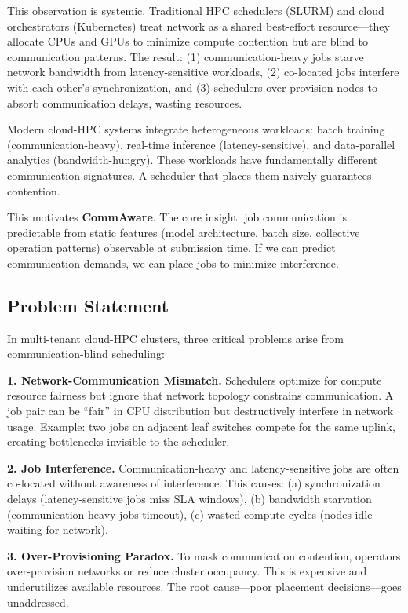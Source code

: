 \documentclass[conference]{IEEEtran}
\begin{document}
This observation is systemic. Traditional HPC schedulers (SLURM) and cloud orchestrators (Kubernetes) treat network as a shared best-effort resource---they allocate CPUs and GPUs to minimize compute contention but are blind to communication patterns. The result: (1) communication-heavy jobs starve network bandwidth from latency-sensitive workloads, (2) co-located jobs interfere with each other's synchronization, and (3) schedulers over-provision nodes to absorb communication delays, wasting resources.

Modern cloud-HPC systems integrate heterogeneous workloads: batch training (communication-heavy), real-time inference (latency-sensitive), and data-parallel analytics (bandwidth-hungry). These workloads have fundamentally different communication signatures. A scheduler that places them naively guarantees contention.

This motivates \textbf{CommAware}. The core insight: job communication is predictable from static features (model architecture, batch size, collective operation patterns) observable at submission time. If we can predict communication demands, we can place jobs to minimize interference.

\subsection{Problem Statement}

In multi-tenant cloud-HPC clusters, three critical problems arise from communication-blind scheduling:

\textbf{1. Network-Communication Mismatch.} Schedulers optimize for compute resource fairness but ignore that network topology constrains communication. A job pair can be ``fair'' in CPU distribution but destructively interfere in network usage. Example: two jobs on adjacent leaf switches compete for the same uplink, creating bottlenecks invisible to the scheduler.

\textbf{2. Job Interference.} Communication-heavy and latency-sensitive jobs are often co-located without awareness of interference. This causes: (a) synchronization delays (latency-sensitive jobs miss SLA windows), (b) bandwidth starvation (communication-heavy jobs timeout), (c) wasted compute cycles (nodes idle waiting for network).

\textbf{3. Over-Provisioning Paradox.} To mask communication contention, operators over-provision networks or reduce cluster occupancy. This is expensive and underutilizes available resources. The root cause---poor placement decisions---goes unaddressed.
\end{document}
